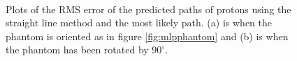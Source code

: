 \documentclass[11pt,a4paper]{article}
\begin{document}
\begin{figure}[!htb]
  \hspace*{\fill}%
  \hfill%
  \hspace*{\fill}\\
  \caption{Plots of the RMS error of the predicted paths of protons using the straight line method and the most likely path. (a) is when the phantom is oriented as in figure \ref{fig:mlpphantom} and (b) is when the phantom has been rotated by $90^{\circ}$.}
\label{fig:mlpInPhantom}
  \end{figure}

\end{document}
